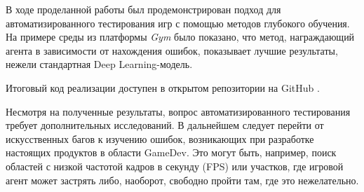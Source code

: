 \Conclusion %

В ходе проделанной работы был продемонстрирован подход для автоматизированного тестирования игр с помощью методов глубокого обучения. На примере среды из платформы \textit{Gym} было показано, что метод, награждающий агента в зависимости от нахождения ошибок, показывает лучшие результаты, нежели стандартная Deep Learning-модель.

Итоговый код реализации доступен в открытом репозитории на GitHub \cite{rl4testing}.

Несмотря на полученные результаты, вопрос автоматизированного тестирования требует дополнительных исследований. В дальнейшем следует перейти от искусственных багов к изучению ошибок, возникающих при разработке настоящих продуктов в области GameDev. Это могут быть, например, поиск областей с низкой частотой кадров в секунду (FPS) или участков, где игровой агент может застрять либо, наоборот, свободно пройти там, где это нежелательно. 

